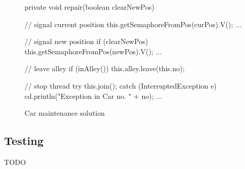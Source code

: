 \begin{figure}[H]
\label{lst:main-rep}
  \begin{java}
private void repair(boolean clearNewPos) {
    // signal current position
    this.getSemaphoreFromPos(curPos).V();
    ...

    // signal new position
    if (clearNewPos) {
        this.getSemaphoreFromPos(newPos).V();
        ...
    }

    // leave alley
    if (inAlley())
        this.alley.leave(this.no);

    // stop thread
    try {
        this.join();
    } catch (InterruptedException e) {
        cd.println("Exception in Car no. " + no);
        ...
    }
}
  \end{java}
  \caption{Car maintenance solution}
\end{figure}


\subsection{Testing}
\label{sub:main-test}
TODO
